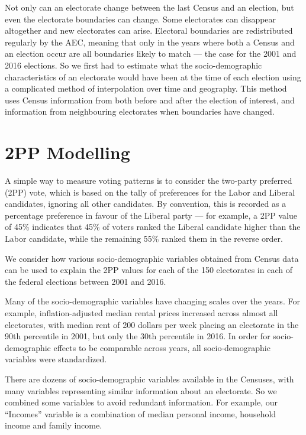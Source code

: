 \documentclass[11pt,a4paper,]{article}
\begin{document}
Not only can an electorate change between the last Census and an election, but even the electorate boundaries can change. Some electorates can disappear altogether and new electorates can arise. Electoral boundaries are redistributed regularly by the AEC, meaning that only in the years where both a Census and an election occur are all boundaries likely to match --- the case for the 2001 and 2016 elections. So we first had to estimate what the socio-demographic characteristics of an electorate would have been at the time of each election using a complicated method of interpolation over time and geography. This method uses Census information from both before and after the election of interest, and information from neighbouring electorates when boundaries have changed.

\hypertarget{modelling}{%
\section{2PP Modelling}\label{modelling}}

A simple way to measure voting patterns is to consider the two-party preferred (2PP) vote, which is based on the tally of preferences for the Labor and Liberal candidates, ignoring all other candidates. By convention, this is recorded as a percentage preference in favour of the Liberal party --- for example, a 2PP value of 45\% indicates that 45\% of voters ranked the Liberal candidate higher than the Labor candidate, while the remaining 55\% ranked them in the reverse order.

We consider how various socio-demographic variables obtained from Census data can be used to explain the 2PP values for each of the 150 electorates in each of the federal elections between 2001 and 2016.

Many of the socio-demographic variables have changing scales over the years. For example, inflation-adjusted median rental prices increased across almost all electorates, with median rent of 200 dollars per week placing an electorate in the 90th percentile in 2001, but only the 30th percentile in 2016. In order for socio-demographic effects to be comparable across years, all socio-demographic variables were standardized.

There are dozens of socio-demographic variables available in the Censuses, with many variables representing similar information about an electorate. So we combined some variables to avoid redundant information. For example, our ``Incomes'' variable is a combination of median personal income, household income and family income.
\end{document}
